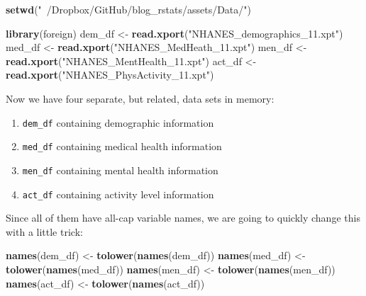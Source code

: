 \documentclass[]{tufte-book}
\newenvironment{Shaded}{}{}
\newcommand{\KeywordTok}[1]{\textcolor[rgb]{0.00,0.44,0.13}{\textbf{#1}}}
\newcommand{\StringTok}[1]{\textcolor[rgb]{0.25,0.44,0.63}{#1}}
\newcommand{\NormalTok}[1]{#1}
\providecommand{\tightlist}{%
  \setlength{\itemsep}{0pt}\setlength{\parskip}{0pt}}
\theoremstyle{definition}
\theoremstyle{definition}
\theoremstyle{remark}
\begin{document}
\begin{Shaded}
\begin{Highlighting}[]
\KeywordTok{setwd}\NormalTok{(}\StringTok{"~/Dropbox/GitHub/blog_rstats/assets/Data/"}\NormalTok{)}
\end{Highlighting}
\end{Shaded}

\begin{Shaded}
\begin{Highlighting}[]
\KeywordTok{library}\NormalTok{(foreign)}
\NormalTok{dem_df <-}\StringTok{ }\KeywordTok{read.xport}\NormalTok{(}\StringTok{"NHANES_demographics_11.xpt"}\NormalTok{)}
\NormalTok{med_df <-}\StringTok{ }\KeywordTok{read.xport}\NormalTok{(}\StringTok{"NHANES_MedHeath_11.xpt"}\NormalTok{)}
\NormalTok{men_df <-}\StringTok{ }\KeywordTok{read.xport}\NormalTok{(}\StringTok{"NHANES_MentHealth_11.xpt"}\NormalTok{)}
\NormalTok{act_df <-}\StringTok{ }\KeywordTok{read.xport}\NormalTok{(}\StringTok{"NHANES_PhysActivity_11.xpt"}\NormalTok{)}
\end{Highlighting}
\end{Shaded}

Now we have four separate, but related, data sets in memory:

\begin{enumerate}
\def\labelenumi{\arabic{enumi}.}
\tightlist
\item
  \texttt{dem\_df} containing demographic information
\item
  \texttt{med\_df} containing medical health information
\item
  \texttt{men\_df} containing mental health information
\item
  \texttt{act\_df} containing activity level information
\end{enumerate}

Since all of them have all-cap variable names, we are going to quickly
change this with a little trick:

\begin{Shaded}
\begin{Highlighting}[]
\KeywordTok{names}\NormalTok{(dem_df) <-}\StringTok{ }\KeywordTok{tolower}\NormalTok{(}\KeywordTok{names}\NormalTok{(dem_df))}
\KeywordTok{names}\NormalTok{(med_df) <-}\StringTok{ }\KeywordTok{tolower}\NormalTok{(}\KeywordTok{names}\NormalTok{(med_df))}
\KeywordTok{names}\NormalTok{(men_df) <-}\StringTok{ }\KeywordTok{tolower}\NormalTok{(}\KeywordTok{names}\NormalTok{(men_df))}
\KeywordTok{names}\NormalTok{(act_df) <-}\StringTok{ }\KeywordTok{tolower}\NormalTok{(}\KeywordTok{names}\NormalTok{(act_df))}
\end{Highlighting}
\end{Shaded}
\end{document}
